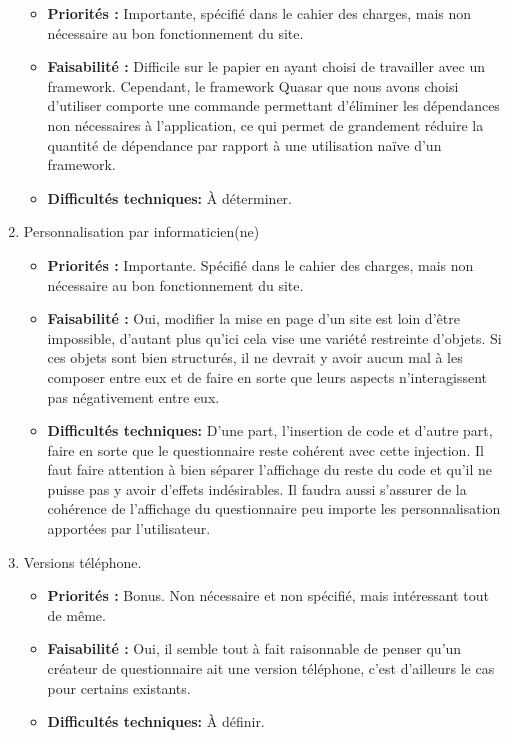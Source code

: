 \documentclass{article}
\begin{document}
\begin{enumerate}[noitemsep]
\begin{itemize}[noitemsep]
\item \textbf{Priorités : }Importante, spécifié dans le cahier des charges, mais non nécessaire au bon fonctionnement du site.
\item \textbf{Faisabilité : } Difficile sur le papier en ayant choisi de travailler avec un framework. Cependant, le framework Quasar que nous avons choisi d'utiliser comporte une commande permettant d'éliminer les dépendances non nécessaires à l'application, ce qui permet de grandement réduire la quantité de dépendance par rapport à une utilisation naïve d'un framework.
\item \textbf{Difficultés techniques: } À déterminer.
\end{itemize}
\item Personnalisation par informaticien(ne)
\begin{itemize}[noitemsep]
\item \textbf{Priorités : }Importante. Spécifié dans le cahier des charges, mais non nécessaire au bon fonctionnement du site.
\item \textbf{Faisabilité : }Oui, modifier la mise en page d'un site est loin d'être impossible, d'autant plus qu'ici cela vise une variété restreinte d'objets. Si ces objets sont bien structurés, il ne devrait y avoir aucun mal à les composer entre eux et de faire en sorte que leurs aspects n'interagissent pas négativement entre eux.
\item \textbf{Difficultés techniques: } D'une part, l'insertion de code et d'autre part, faire en sorte que le questionnaire reste cohérent avec cette injection. Il faut faire attention à bien séparer l'affichage du reste du code et qu'il ne puisse pas y avoir d'effets indésirables. Il faudra aussi s'assurer de la cohérence de l'affichage du questionnaire peu importe les personnalisation apportées par l'utilisateur.
\end{itemize}
\item Versions téléphone.
\begin{itemize}[noitemsep]
\item \textbf{Priorités : }Bonus. Non nécessaire et non spécifié, mais intéressant tout de même.
\item \textbf{Faisabilité : } Oui, il semble tout à fait raisonnable de penser qu'un créateur de questionnaire ait une version téléphone, c'est d'ailleurs le cas pour certains existants.
\item \textbf{Difficultés techniques: } À définir.
\end{itemize}
\end{enumerate}
\end{document}
